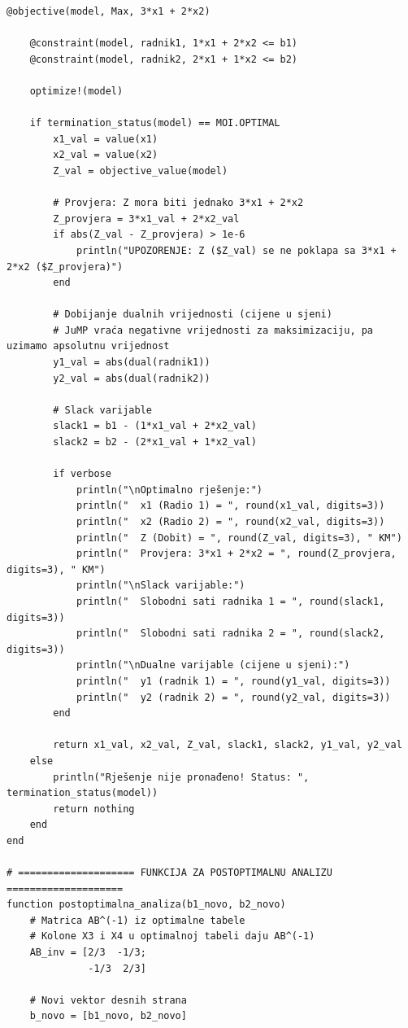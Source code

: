 \documentclass[12pt,a4paper]{article}
\begin{document}
\begin{lstlisting}[style=julia, caption={Julia kod za postoptimalnu analizu}]
    @objective(model, Max, 3*x1 + 2*x2)
    
    @constraint(model, radnik1, 1*x1 + 2*x2 <= b1)
    @constraint(model, radnik2, 2*x1 + 1*x2 <= b2)
    
    optimize!(model)
    
    if termination_status(model) == MOI.OPTIMAL
        x1_val = value(x1)
        x2_val = value(x2)
        Z_val = objective_value(model)
        
        # Provjera: Z mora biti jednako 3*x1 + 2*x2
        Z_provjera = 3*x1_val + 2*x2_val
        if abs(Z_val - Z_provjera) > 1e-6
            println("UPOZORENJE: Z ($Z_val) se ne poklapa sa 3*x1 + 2*x2 ($Z_provjera)")
        end
        
        # Dobijanje dualnih vrijednosti (cijene u sjeni)
        # JuMP vraća negativne vrijednosti za maksimizaciju, pa uzimamo apsolutnu vrijednost
        y1_val = abs(dual(radnik1))
        y2_val = abs(dual(radnik2))
        
        # Slack varijable
        slack1 = b1 - (1*x1_val + 2*x2_val)
        slack2 = b2 - (2*x1_val + 1*x2_val)
        
        if verbose
            println("\nOptimalno rješenje:")
            println("  x1 (Radio 1) = ", round(x1_val, digits=3))
            println("  x2 (Radio 2) = ", round(x2_val, digits=3))
            println("  Z (Dobit) = ", round(Z_val, digits=3), " KM")
            println("  Provjera: 3*x1 + 2*x2 = ", round(Z_provjera, digits=3), " KM")
            println("\nSlack varijable:")
            println("  Slobodni sati radnika 1 = ", round(slack1, digits=3))
            println("  Slobodni sati radnika 2 = ", round(slack2, digits=3))
            println("\nDualne varijable (cijene u sjeni):")
            println("  y1 (radnik 1) = ", round(y1_val, digits=3))
            println("  y2 (radnik 2) = ", round(y2_val, digits=3))
        end
        
        return x1_val, x2_val, Z_val, slack1, slack2, y1_val, y2_val
    else
        println("Rješenje nije pronađeno! Status: ", termination_status(model))
        return nothing
    end
end

# ==================== FUNKCIJA ZA POSTOPTIMALNU ANALIZU ====================
function postoptimalna_analiza(b1_novo, b2_novo)
    # Matrica AB^(-1) iz optimalne tabele
    # Kolone X3 i X4 u optimalnoj tabeli daju AB^(-1)
    AB_inv = [2/3  -1/3;
              -1/3  2/3]
    
    # Novi vektor desnih strana
    b_novo = [b1_novo, b2_novo]
    

\end{lstlisting}
\end{document}
